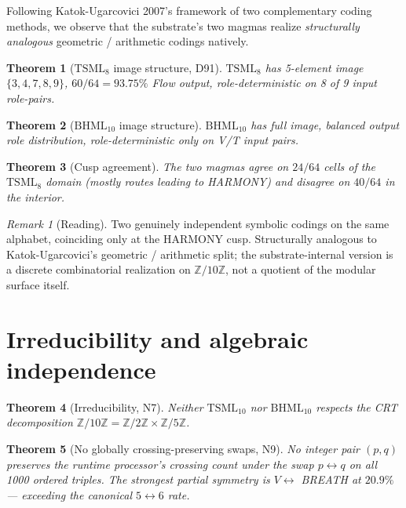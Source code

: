 \documentclass[11pt,reqno]{amsart}
\theoremstyle{plain}
\newtheorem{theorem}{Theorem}[section]
\theoremstyle{definition}
\theoremstyle{remark}
\newtheorem*{remark}{Remark}
\newcommand{\Z}{\mathbb{Z}}
\newcommand{\TS}{\mathrm{TSML}}
\newcommand{\BH}{\mathrm{BHML}}
\begin{document}
Following Katok-Ugarcovici 2007's framework of two complementary
coding methods, we observe that the substrate's two magmas realize
\emph{structurally analogous} geometric / arithmetic codings natively.

\begin{theorem}[$\TS_{8}$ image structure, D91]\label{thm:tsml-image}
$\TS_{8}$ has 5-element image $\{3, 4, 7, 8, 9\}$, $60/64 = 93.75\%$
Flow output, role-deterministic on 8 of 9 input role-pairs.
\end{theorem}

\begin{theorem}[$\BH_{10}$ image structure]\label{thm:bhml-image}
$\BH_{10}$ has full image, balanced output role distribution,
role-deterministic only on V/T input pairs.
\end{theorem}

\begin{theorem}[Cusp agreement]\label{thm:cusp}
The two magmas agree on $24/64$ cells of the $\TS_{8}$ domain (mostly
routes leading to HARMONY) and disagree on $40/64$ in the interior.
\end{theorem}

\begin{remark}[Reading]
Two genuinely independent symbolic codings on the same alphabet,
coinciding only at the HARMONY cusp. Structurally analogous to
Katok-Ugarcovici's geometric / arithmetic split; the substrate-internal
version is a discrete combinatorial realization on $\Z/10\Z$, not a
quotient of the modular surface itself.
\end{remark}

\section{Irreducibility and algebraic independence}

\begin{theorem}[Irreducibility, N7]\label{thm:irreducibility}
Neither $\TS_{10}$ nor $\BH_{10}$ respects the CRT decomposition
$\Z/10\Z = \Z/2\Z \times \Z/5\Z$.
\end{theorem}

\begin{theorem}[No globally crossing-preserving swaps, N9]
\label{thm:no-swap}
No integer pair $(p, q)$ preserves the runtime processor's crossing
count under the swap $p \leftrightarrow q$ on all 1000 ordered
triples. The strongest partial symmetry is $V \leftrightarrow$ BREATH
at $20.9\%$ --- exceeding the canonical $5 \leftrightarrow 6$ rate.
\end{theorem}
\end{document}
